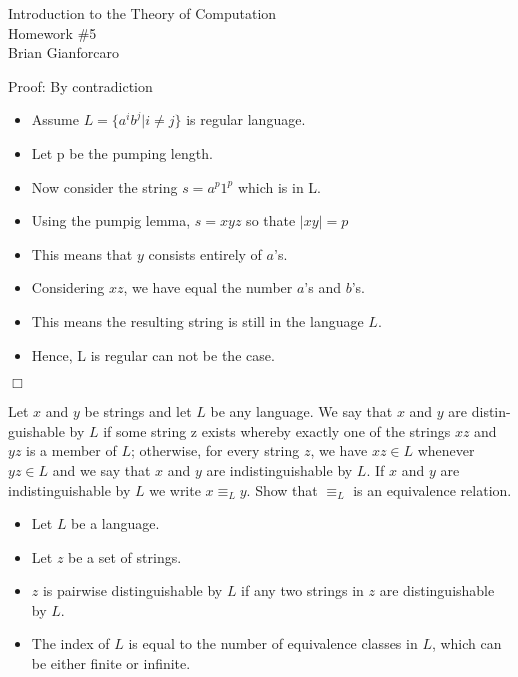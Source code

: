 \documentclass[11pt]{article}
\newcommand{\question}[2] {\vspace{.25in} \fbox{#1} #2 \vspace{.10in}}
\begin{document}
\medskip                        %

\begin{center}                  %
  {\Large Introduction to the Theory of Computation \\ Homework \#5} \\
  Brian Gianforcaro \\
  \date \\
\end{center}


\question{1}{Proof: By contradiction}
\begin{center}
  \begin{itemize}
    \item Assume $L = \{ a^{i} b^{j} | i \ne j \} $ is regular language.
    \item Let p be the pumping length.
    \item Now consider the string $s = a^{p}1^{p}$ which is in L.
    \item Using the pumpig lemma, $s = xyz$ so thate $|xy| = p$
    \item This means that $y$ consists entirely of $a$'s.
    \item Considering $xz$, we have equal the number $a$'s and $b$'s.
    \item This means the resulting string is still in the language $L$.
    \item Hence, L is regular can not be the case.
  \end{itemize}
\end{center}

\indent $\Box$


\question{2}{
Let $x$ and $y$ be strings and let $L$ be any language. We say that $x$ and $y$ are distin- 
guishable by $L$ if some string z exists whereby exactly one of the strings $xz$ and $yz$ 
is a member of $L$; otherwise, for every string $z$, we have $xz \in L$ whenever $yz \in L$ 
and we say that $x$ and $y$ are indistinguishable by $L$. If $x$ and $y$ are indistinguishable 
by $L$ we write $x {\equiv}_{L} y$. Show that ${\equiv}_{L}$ is an equivalence relation.
  }

\begin{itemize}
\item Let $L$ be a language.
\item Let $z$ be a set of strings.
\item $z$ is pairwise distinguishable by $L$ if any two strings in $z$ are distinguishable by $L$.
\item The index of $L$ is equal to the number of equivalence classes in $L$, which can be either finite or infinite.
\end{itemize}
\end{document}

